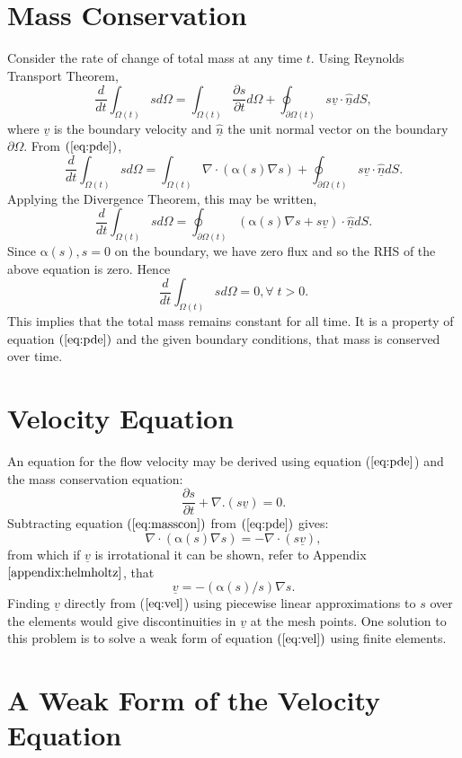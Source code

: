 \documentclass[11pt]{article}
\newcommand{\pl}{\partial}
\newcommand{\ul}{\underline}
\newcommand{\Om}{\Omega}
\newcommand{\al}{\mathrm{\alpha}}
\begin{document}
\section{Mass Conservation}
Consider the rate of change of total mass at any time $t$. Using Reynolds Transport Theorem, 
$$\frac{d}{dt}\int_{\Om(t)}sd\Om = \int_{\Om(t)}\frac{\pl{s}}{\pl{t}}d\Om + \oint_{\pl{\Om(t)}}s\ul{v}\cdot\hat{\ul{n}}dS,  $$
where $\ul{v}$ is the boundary velocity and $\hat{\ul{n}}$ the unit normal vector on the boundary $\pl{\Om}$. 
From $(\ref{eq:pde})$,
$$\frac{d}{dt}\int_{\Om(t)}sd\Om= \int_{\Om(t)}\nabla\cdot\left(\al(s)\nabla{s}\right) + \oint_{\pl{\Om(t)}}s\ul{v}\cdot\hat{\ul{n}}dS. $$
Applying the Divergence Theorem, this may be written,
$$\frac{d}{dt}\int_{\Om(t)}sd\Om = \oint_{\pl{\Om(t)}}\left(  \al(s)\nabla{s} +  s\ul{v}\right)\cdot\hat{\ul{n}}dS. $$  
Since $\al(s), s =0$ on the boundary, we have zero flux and so the RHS of the above equation is zero. Hence
$$  \frac{d}{dt}\int_{\Om(t)}sd\Om =0, \forall \;t>0 .$$This implies that the total mass remains constant for all time. It is a property of equation $(\ref{eq:pde})$ and the given boundary conditions, that mass is conserved over time.
\section{Velocity Equation}
An equation for the flow velocity may be derived using equation ($\ref{eq:pde}$) and the mass conservation equation:
\begin{equation}
\label{eq:masscon}
\frac{\pl{s} }{\pl{t} } + \nabla.(s\underline{v}) =0.
\end{equation}
Subtracting equation $(\ref{eq:masscon})$ from $(\ref{eq:pde})$ gives:
\begin{equation}
\label{eq:vel0}
\nabla\cdot\left(\al(s)\nabla{s}\right) = - \nabla\cdot(s\underline{v}),
\end{equation}
from which if $\ul{v}$ is irrotational it can be shown, refer to Appendix $\ref{appendix:helmholtz}$, that
\begin{equation}
\label{eq:vel}
\underline{v} =  -\left(\al(s)/s\right)\nabla{s}.
\end{equation}
Finding $\ul{v}$ directly from ($\ref{eq:vel}$) using piecewise linear approximations to $s$ over the elements would give discontinuities in $\ul{v}$ at the mesh points. One solution to this problem is to solve a weak form of equation $(\ref{eq:vel})$ using finite elements.
\section{A Weak Form of the Velocity Equation}
\end{document}
